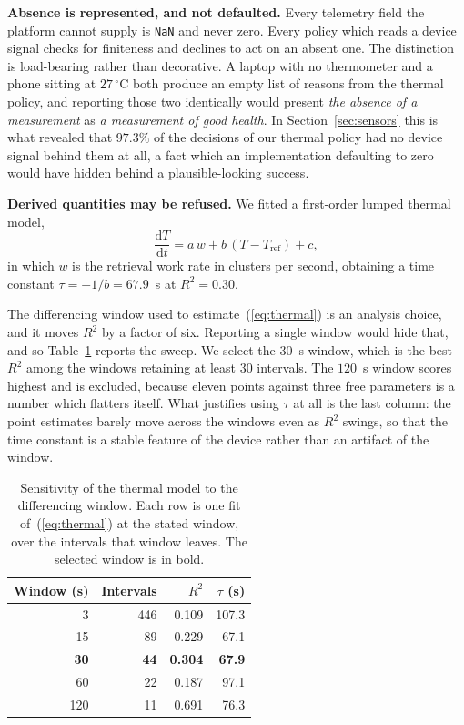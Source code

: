 \documentclass[journal]{IEEEtran}
\newcommand{\degC}{\,^{\circ}\mathrm{C}}
\begin{document}
\textbf{Absence is represented, and not defaulted.} Every telemetry field
the platform cannot supply is \texttt{NaN} and never zero. Every policy
which reads a device signal checks for finiteness and declines to act on an
absent one. The distinction is load-bearing rather than decorative. A
laptop with no thermometer and a phone sitting at $27\degC$ both produce an
empty list of reasons from the thermal policy, and reporting those two
identically would present \emph{the absence of a measurement} as \emph{a
measurement of good health}. In Section~\ref{sec:sensors} this is what
revealed that $97.3\%$ of the decisions of our thermal policy had no device
signal behind them at all, a fact which an implementation defaulting to
zero would have hidden behind a plausible-looking success.

\textbf{Derived quantities may be refused.} We fitted a first-order lumped
thermal model,
\begin{equation}
\frac{\mathrm{d}T}{\mathrm{d}t} = a\,w + b\,(T - T_{\mathrm{ref}}) + c ,
\label{eq:thermal}
\end{equation}
in which $w$ is the retrieval work rate in clusters per second, obtaining a
time constant $\tau = -1/b = 67.9$~s at $R^2 = 0.30$.

The differencing window used to estimate~(\ref{eq:thermal}) is an analysis
choice, and it moves $R^2$ by a factor of six. Reporting a single window
would hide that, and so Table~\ref{tab:thermalsweep} reports the sweep. We
select the $30$~s window, which is the best $R^2$ among the windows
retaining at least $30$ intervals. The $120$~s window scores highest and is
excluded, because eleven points against three free parameters is a number
which flatters itself. What justifies using $\tau$ at all is the last
column: the point estimates barely move across the windows even as $R^2$
swings, so that the time constant is a stable feature of the device rather
than an artifact of the window.

\begin{table}[!t]
\caption{Sensitivity of the thermal model to the differencing window. Each
row is one fit of~(\ref{eq:thermal}) at the stated window, over the
intervals that window leaves. The selected window is in bold.}
\label{tab:thermalsweep}
\centering
\begin{tabular}{rrrr}
\toprule
Window (s) & Intervals & $R^2$ & $\tau$ (s) \\
\midrule
3   & 446 & 0.109 & 107.3 \\
15  & 89  & 0.229 & 67.1 \\
\textbf{30}  & \textbf{44}  & \textbf{0.304} & \textbf{67.9} \\
60  & 22  & 0.187 & 97.1 \\
120 & 11  & 0.691 & 76.3 \\
\bottomrule
\end{tabular}
\end{table}
\end{document}
